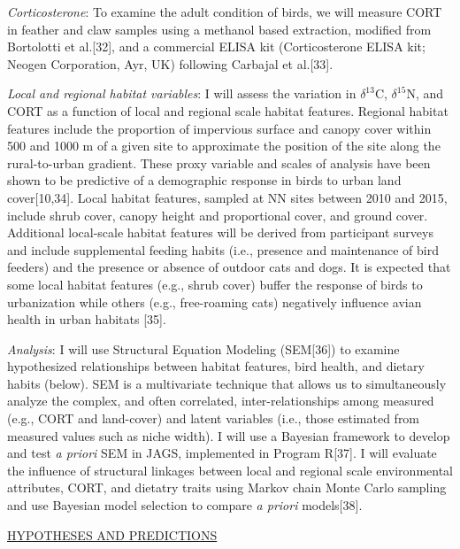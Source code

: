 \documentclass[12pt]{article}
\begin{document}
\noindent \textit{Corticosterone}:  To examine the adult condition of birds, we will measure CORT in feather and claw samples using a methanol based extraction, modified from Bortolotti et al.[32], and a commercial ELISA kit (Corticosterone ELISA kit; Neogen Corporation, Ayr, UK) following Carbajal et al.[33]. \par 

\noindent \textit{Local and regional habitat variables}: I will assess the variation in $\delta^{13}$C,  $\delta^{15}$N, and CORT as a function of local and regional scale habitat features. Regional habitat features include the proportion of impervious surface and canopy cover within 500 and 1000 m of a given site to approximate the position of the site along the rural-to-urban gradient. These proxy variable and scales of analysis have been shown to be predictive of a demographic response in birds to urban land cover[10,34]. Local habitat features, sampled at NN sites between 2010 and 2015, include shrub cover, canopy height and proportional cover, and ground cover. Additional local-scale habitat features will be derived from participant surveys and include supplemental feeding habits (i.e., presence and maintenance of bird feeders) and the presence or absence of outdoor cats and dogs. It is expected that some local habitat features (e.g., shrub cover) buffer the response of birds to urbanization while others (e.g., free-roaming cats) negatively influence avian health in urban habitats [35].\par

\noindent \textit{Analysis}: I will use Structural Equation Modeling (SEM[36]) to examine hypothesized relationships between habitat features, bird health, and dietary habits (below). SEM is a multivariate technique that allows us to simultaneously analyze the complex, and often correlated, inter-relationships among measured (e.g., CORT and land-cover) and latent variables (i.e., those estimated from measured values such as niche width). I will use a Bayesian framework to develop and test \textit{a priori} SEM in JAGS, implemented in Program R[37]. I will evaluate the influence of structural linkages between local and regional scale environmental attributes, CORT, and dietatry traits using Markov chain Monte Carlo sampling and use Bayesian model selection to compare \textit{a priori} models[38]. 


\noindent \underline{HYPOTHESES AND PREDICTIONS}
\end{document}

